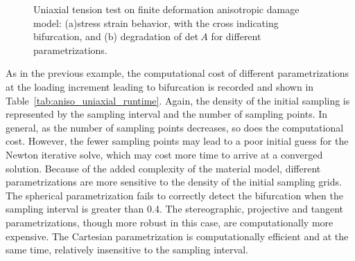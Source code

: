 \documentclass[12pt]{article}
\numberwithin{equation}{section}
\begin{document}
\begin{figure}[H]
  \centering {} 
  \caption{Uniaxial tension test on finite deformation
  anisotropic damage model:
  (a)stress strain behavior, with the cross indicating bifurcation, and
  (b) degradation of det$~A$ for different
  parametrizations.}
  \label{fig:aniso_stress_stretch}
\end{figure}

As in the previous example, the computational cost of different
parametrizations at the loading increment leading to bifurcation is
recorded and shown in Table~\ref{tab:aniso_uniaxial_runtime}. Again,
the density of the initial sampling is represented by the sampling
interval and the number of sampling points. In general, as the number
of sampling points decreases, so does the computational cost. However,
the fewer sampling points may lead to a poor initial guess for the
Newton iterative solve, which may cost more time to arrive at a
converged solution. Because of the added complexity of the material
model, different parametrizations are more sensitive to the density of
the initial sampling grids. The spherical parametrization fails to
correctly detect the bifurcation when the sampling interval is greater
than 0.4. The stereographic, projective and tangent parametrizations,
though more robust in this case, are computationally more expensive.
The Cartesian parametrization is computationally efficient and at the
same time, relatively insensitive to the sampling interval.
\end{document}
